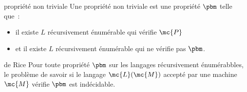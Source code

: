 \begin{definition}{}{propriété non triviale}
    Une propriété non triviale est une propriété $\pbm$ telle que~:
    \begin{itemize}
        \item il existe $L$ récursivement énumérable qui vérifie $\mc{P}$
        \item et il existe $L$ récursivement énumérable qui ne vérifie pas $\pbm$.
    \end{itemize}
\end{definition}

\begin{theoreme}{}{de Rice}
    Pour toute propriété  $\pbm$ sur les langages récursivement énumérabbles, le problème de savoir si le langage $\mc{L}(\mc{M})$ accepté par une machine $\mc{M}$ vérifie $\pbm$ est indécidable.
\end{theoreme}

